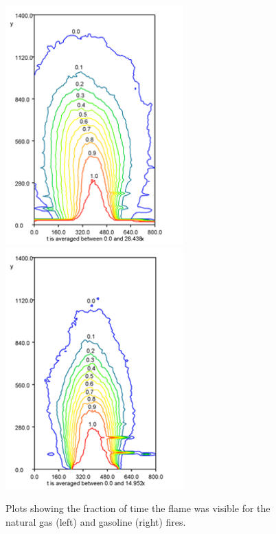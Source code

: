 \documentclass[twoside]{uocthesis}
\begin{document}
{\begin{figure}
  \includegraphics[width=2.7in]{../Figures/Fig20}
  \includegraphics[width=2.7in]{../Figures/Fig21} \\
  \caption[Visibility fractions for the natural gas and gasoline fires]{Plots showing the fraction of time the flame was visible for the natural gas (left) and gasoline (right) fires.}
  \label{Gas_and_Gasoline_Contours}
\end{figure}

}
\end{document}
